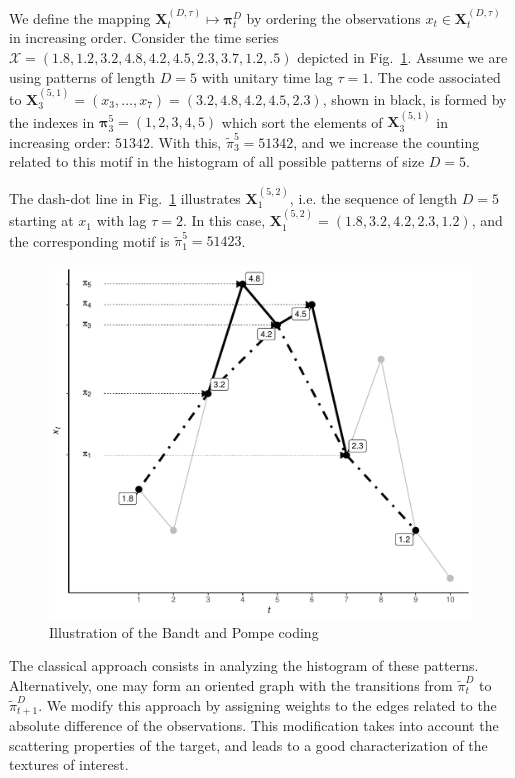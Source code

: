 \documentclass[journal]{IEEEtran}
\begin{document}
We define the mapping ${\mathbf X}_t^{(D,\tau)} \mapsto {\mathbf \pi}_t^{D}$ by ordering the observations $x_t \in {\mathbf X}_t^{(D,\tau)}$ in increasing order.
Consider the time series $\mathcal X = (1.8, 1.2, 3.2, 4.8, 4.2, 4.5, 2.3, 3.7, 1.2, .5)$ depicted in Fig.~\ref{Fig:IntroBP}.
Assume we are using patterns of length $D=5$ with unitary time lag $\tau=1$.
The code associated to $\mathbf X_{3}^{(5,1)}=(x_3,\dots,x_7)=(3.2, 4.8, 4.2, 4.5, 2.3)$, shown in black, is formed by the indexes in $\bm\pi_3^{5}=(1,2,3,4,5)$ which sort the elements of $\mathbf X_{3}^{(5,1)}$ in increasing order: $51342$.
With this, $\widetilde{\pi}_3^{5} = 51342$, and we increase the counting related to this motif in the histogram of all possible patterns of size $D=5$.

The dash-dot line in Fig.~\ref{Fig:IntroBP} illustrates $\mathbf X_{1}^{(5,2)}$, i.e. the sequence of length $D=5$ starting at $x_1$ with lag $\tau=2$.
In this case, $\mathbf X_{1}^{(5,2)}= (1.8, 3.2, 4.2, 2.3, 1.2)$, and the corresponding motif is $\widetilde{\pi}_1^{5}=51423$.

\begin{figure}[hbt]
	\centering
	\includegraphics[width=.9\linewidth]{Figures/IntroBP.pdf}
	\caption{Illustration of the Bandt and Pompe coding\label{Fig:IntroBP}}
\end{figure}

The classical approach consists in analyzing the histogram of these patterns.
Alternatively, one may form an oriented graph with the transitions from $\widetilde\pi_t^D$ to $\widetilde\pi_{t+1}^D$. 
We modify this approach by assigning weights to the edges related to the absolute difference of the observations.
This modification takes into account the scattering properties of the target, and leads to a good characterization of the textures of interest.
\end{document}
